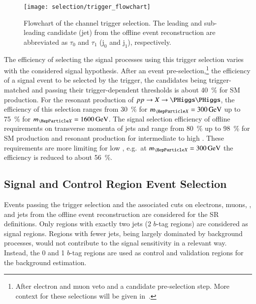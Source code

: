 \begin{figure}[htbp]
  \centering

  \texttt{[image: selection/trigger\_flowchart]}

  \caption{Flowchart of the \hadhad channel trigger selection. The
    leading and sub-leading \tauhadvis candidate (jet) from the
    offline event reconstruction are abbreviated as $\tau_0$ and
    $\tau_1$ ($\text{j}_0$ and $\text{j}_1$), respectively.}%
  \label{fig:trigger_selection_flowchart}
\end{figure}

The efficiency of selecting the signal processes using this trigger
selection varies with the considered signal hypothesis. After an event
pre-selection,\footnote{After electron and muon veto and a \tauhadvis
  candidate pre-selection step. More context for these selections will
  be given in~.} the efficiency of a signal event to
be selected by the trigger, the \tauhadvis candidates being
trigger-matched and passing their trigger-dependent \pT thresholds is
about \SI{40}{\percent} for SM \HH production. For the resonant
production of $pp \to X \to \HH$, the efficiency of this selection
ranges from \SI{30}{\percent} for $\mX = \SI{300}{\GeV}$ up to
\SI{75}{\percent} for $\mX = \SI{1600}{\GeV}$. The signal selection
efficiency of offline requirements on transverse momenta of jets and
\dRtautau range from \SI{80}{\percent} up to \SI{98}{\percent} for SM
\HH production and resonant production for intermediate to high
\mX. These requirements are more limiting for low \mX, e.g.\ at
$\mX = \SI{300}{\GeV}$ the efficiency is reduced to about
\SI{56}{\percent}.





\subsection{Signal and Control Region Event Selection}%
\label{sec:sr_and_cr_selection}

Events passing the trigger selection and the associated cuts on electrons,
muons, \tauhadvis, and jets from the offline event reconstruction are considered
for the SR definitions.  Only regions with exactly two \btagged jets (2 $b$-tag
regions) are considered as signal regions. Regions with fewer \btagged jets,
being largely dominated by background processes, would not contribute to the
signal sensitivity in a relevant way. Instead, the 0 and 1 $b$-tag regions are
used as control and validation regions for the background estimation.

